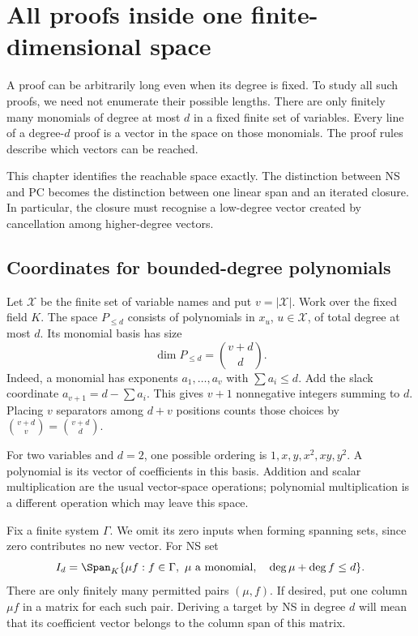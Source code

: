 \chapter{All proofs inside one finite-dimensional space}\label{tx:ch:closure}\label{tx:sec:pc-space}
A proof can be arbitrarily long even when its degree is fixed. To study
all such proofs, we need not enumerate their possible lengths. There
are only finitely many monomials of degree at most $d$ in a fixed finite
set of variables. Every line of a degree-$d$ proof is a vector in the
space on those monomials. The proof rules describe which vectors can
be reached.

This chapter identifies the reachable space exactly. The distinction
between NS and PC becomes the distinction between one linear span and
an iterated closure. In particular, the closure must recognise a
low-degree vector created by cancellation among higher-degree vectors.

\section{Coordinates for bounded-degree polynomials}
Let $\mathcal X$ be the finite set of variable names and put
$v=|\mathcal X|$. Work over the fixed field $K$. The space $P_{\le d}$
consists of polynomials in $x_u$, $u\in\mathcal X$, of total degree at
most $d$. Its monomial basis has size
\[
                     \dim P_{\le d}=\binom{v+d}{d}.
\]
Indeed, a monomial has exponents $a_1,\ldots,a_v$ with
$\sum a_i\le d$. Add the slack coordinate
$a_{v+1}=d-\sum a_i$. This gives $v+1$ nonnegative integers summing
to $d$. Placing $v$ separators among $d+v$ positions counts those
choices by $\binom{v+d}{v}=\binom{v+d}{d}$.

For two variables and $d=2$, one possible ordering is
$1,x,y,x^2,xy,y^2$. A polynomial is its vector of coefficients in this
basis. Addition and scalar multiplication are the usual vector-space
operations; polynomial multiplication is a different operation which
may leave this space.

Fix a finite system $\Gamma$. We omit its zero inputs when forming
spanning sets, since zero contributes no new vector. For NS set
\begin{equation}\label{tx:eq:NSspan}
 I_d=\Span_K\{\mu f:f\in\Gamma,\ \mu\text{ a monomial},\quad
                              \deg\mu+\deg f\le d\}.
\end{equation}
There are only finitely many permitted pairs $(\mu,f)$. If desired,
put one column $\mu f$ in a matrix for each such pair. Deriving a target
by NS in degree $d$ will mean that its coefficient vector belongs to
the column span of this matrix.

